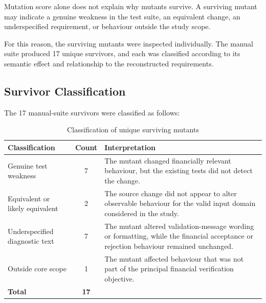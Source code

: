 \documentclass[12pt]{article}
\begin{document}
Mutation score alone does not explain why mutants survive. A surviving mutant
may indicate a genuine weakness in the test suite, an equivalent change, an
underspecified requirement, or behaviour outside the study scope.

For this reason, the surviving mutants were inspected individually. The manual
suite produced 17 unique survivors, and each was classified according to its
semantic effect and relationship to the reconstructed requirements.

\subsection{Survivor Classification}

The 17 manual-suite survivors were classified as follows:

\begin{table}[H]
\centering
\caption{Classification of unique surviving mutants}
\label{tab:survivor-classification}
\footnotesize
\setlength{\tabcolsep}{4pt}

\begin{tabular}{|p{5.4cm}|c|p{7.2cm}|}
\hline
\textbf{Classification} &
\textbf{Count} &
\textbf{Interpretation} \\
\hline

Genuine test weakness &
7 &
The mutant changed financially relevant behaviour, but the existing tests did
not detect the change. \\
\hline

Equivalent or likely equivalent &
2 &
The source change did not appear to alter observable behaviour for the valid
input domain considered in the study. \\
\hline

Underspecified diagnostic text &
7 &
The mutant altered validation-message wording or formatting, while the
financial acceptance or rejection behaviour remained unchanged. \\
\hline

Outside core scope &
1 &
The mutant affected behaviour that was not part of the principal financial
verification objective. \\
\hline

\textbf{Total} &
\textbf{17} &
\\
\hline

\end{tabular}

\setlength{\tabcolsep}{6pt}
\end{table}
\end{document}
